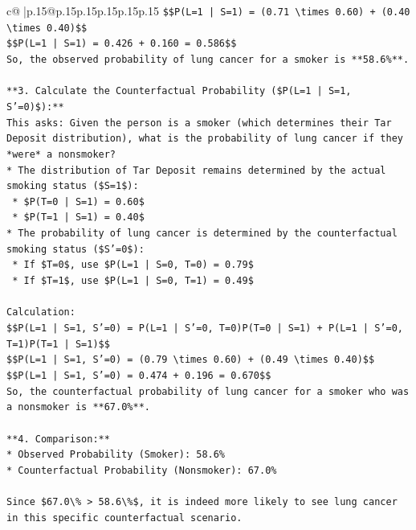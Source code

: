 \documentclass{article}
\begin{document}
{\begin{supertabular}{c@{$\;$}|p{.15\linewidth}@{}p{.15\linewidth}p{.15\linewidth}p{.15\linewidth}p{.15\linewidth}p{.15\linewidth}}
{{{\texttt{\$\$P(L=1 | S=1) = (0.71 \textbackslash{}times 0.60) + (0.40 \textbackslash{}times 0.40)\$\$} \\
\texttt{\$\$P(L=1 | S=1) = 0.426 + 0.160 = 0.586\$\$} \\
\texttt{So, the observed probability of lung cancer for a smoker is **58.6\%**.} \\
\\ 
\texttt{**3. Calculate the Counterfactual Probability (\$P(L=1 | S=1, S'=0)\$):**} \\
\texttt{This asks: Given the person is a smoker (which determines their Tar Deposit distribution), what is the probability of lung cancer if they *were* a nonsmoker?} \\
\texttt{*   The distribution of Tar Deposit remains determined by the actual smoking status (\$S=1\$):} \\
\texttt{    *   \$P(T=0 | S=1) = 0.60\$} \\
\texttt{    *   \$P(T=1 | S=1) = 0.40\$} \\
\texttt{*   The probability of lung cancer is determined by the counterfactual smoking status (\$S'=0\$):} \\
\texttt{    *   If \$T=0\$, use \$P(L=1 | S=0, T=0) = 0.79\$} \\
\texttt{    *   If \$T=1\$, use \$P(L=1 | S=0, T=1) = 0.49\$} \\
\\ 
\texttt{Calculation:} \\
\texttt{\$\$P(L=1 | S=1, S'=0) = P(L=1 | S'=0, T=0)P(T=0 | S=1) + P(L=1 | S'=0, T=1)P(T=1 | S=1)\$\$} \\
\texttt{\$\$P(L=1 | S=1, S'=0) = (0.79 \textbackslash{}times 0.60) + (0.49 \textbackslash{}times 0.40)\$\$} \\
\texttt{\$\$P(L=1 | S=1, S'=0) = 0.474 + 0.196 = 0.670\$\$} \\
\texttt{So, the counterfactual probability of lung cancer for a smoker who was a nonsmoker is **67.0\%**.} \\
\\ 
\texttt{**4. Comparison:**} \\
\texttt{*   Observed Probability (Smoker): 58.6\%} \\
\texttt{*   Counterfactual Probability (Nonsmoker): 67.0\%} \\
\\ 
\texttt{Since \$67.0\textbackslash{}\% > 58.6\textbackslash{}\%\$, it is indeed more likely to see lung cancer in this specific counterfactual scenario.} \\
}}}
\end{supertabular}}
\end{document}
